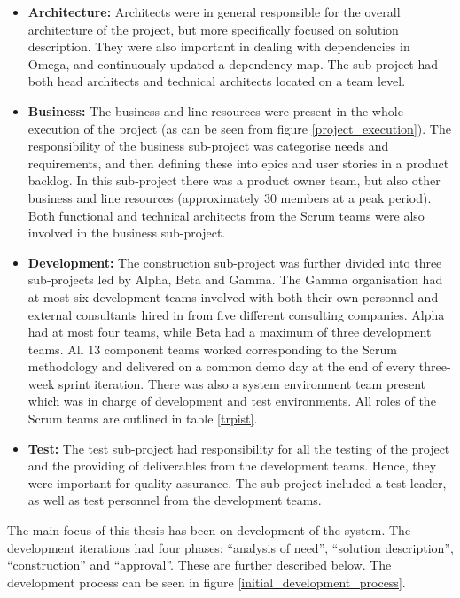 \begin{itemize}
   \item \textbf{Architecture:} Architects were in general responsible for the overall architecture of the project, but more specifically focused on solution description. They were also important in dealing with dependencies in Omega, and continuously updated a dependency map. The sub-project had both head architects and technical architects located on a team level.
   \item \textbf{Business:} The business and line resources were present in the whole execution of the project (as can be seen from figure \ref{project_execution}). The responsibility of the business sub-project was categorise needs and requirements, and then defining these into epics and user stories in a product backlog. In this sub-project there was a product owner team, but also other business and line resources (approximately 30 members at a peak period). Both functional and technical architects from the Scrum teams were also involved in the business sub-project.
   \item \textbf{Development:} The construction sub-project was further divided into three sub-projects led by Alpha, Beta and Gamma. The Gamma organisation had at most six development teams involved with both their own personnel and external consultants hired in from five different consulting companies. Alpha had at most four teams, while Beta had a maximum of three development teams. All 13 component teams worked corresponding to the Scrum methodology and delivered on a common demo day at the end of every three-week sprint iteration. There was also a system environment team present which was in charge of development and test environments. All roles of the Scrum teams are outlined in table \ref{trpist}.
   \item \textbf{Test:} The test sub-project had responsibility for all the testing of the project and the providing of deliverables from the development teams. Hence, they were important for quality assurance. The sub-project included a test leader, as well as test personnel from the development teams.
\end{itemize}

The main focus of this thesis has been on development of the system. The development iterations had four phases: ``analysis of need'', ``solution description'', ``construction'' and ``approval''. These are further described below. The development process can be seen in figure \ref{initial_development_process}.

